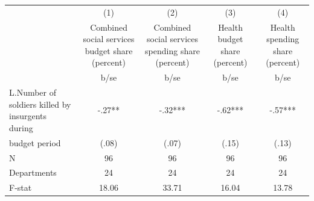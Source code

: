 {
\def\sym#1{\ifmmode^{#1}\else\(^{#1}\)\fi}
\begin{tabular}{l*{4}{c}}
\hline\hline
                                                  &\multicolumn{1}{c}{(1)}&\multicolumn{1}{c}{(2)}&\multicolumn{1}{c}{(3)}&\multicolumn{1}{c}{(4)}\\
                                                  &\multicolumn{1}{c}{Combined social services budget share (percent)}&\multicolumn{1}{c}{Combined social services spending share (percent)}&\multicolumn{1}{c}{Health budget share (percent)}&\multicolumn{1}{c}{Health spending share (percent)}\\
                                                  &        b/se   &        b/se   &        b/se   &        b/se   \\
\hline
L.Number of soldiers killed by insurgents during  &        -.27** &        -.32***&        -.62***&        -.57***\\
budget period                                     &       (.08)   &       (.07)   &       (.15)   &       (.13)   \\
\hline
N                                                 &          96   &          96   &          96   &          96   \\
Departments                                       &          24   &          24   &          24   &          24   \\
F-stat                                            &       18.06   &       33.71   &       16.04   &       13.78   \\
\hline\hline
\end{tabular}
}
